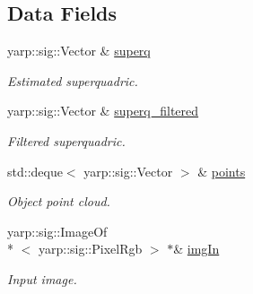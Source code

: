 \subsection*{Data Fields}
\begin{DoxyCompactItemize}
\item 
yarp\-::sig\-::\-Vector \& \hyperlink{classSuperqVisualization_a57358b13afc9b5aa3920b7c96b20b26d}{superq}\label{classSuperqVisualization_a57358b13afc9b5aa3920b7c96b20b26d}

\begin{DoxyCompactList}\small\item\em Estimated superquadric. \end{DoxyCompactList}\item 
yarp\-::sig\-::\-Vector \& \hyperlink{classSuperqVisualization_aed6197ba510529ed07d32a1a86a48e83}{superq\-\_\-filtered}\label{classSuperqVisualization_aed6197ba510529ed07d32a1a86a48e83}

\begin{DoxyCompactList}\small\item\em Filtered superquadric. \end{DoxyCompactList}\item 
std\-::deque$<$ yarp\-::sig\-::\-Vector $>$ \& \hyperlink{classSuperqVisualization_aa00fb7590a7bc410387e041fbdfb162a}{points}\label{classSuperqVisualization_aa00fb7590a7bc410387e041fbdfb162a}

\begin{DoxyCompactList}\small\item\em Object point cloud. \end{DoxyCompactList}\item 
yarp\-::sig\-::\-Image\-Of\\*
$<$ yarp\-::sig\-::\-Pixel\-Rgb $>$ $\ast$\& \hyperlink{classSuperqVisualization_a884771e5af001207eb1ba6e9ac15f8a1}{img\-In}\label{classSuperqVisualization_a884771e5af001207eb1ba6e9ac15f8a1}

\begin{DoxyCompactList}\small\item\em Input image. \end{DoxyCompactList}\end{DoxyCompactItemize}
